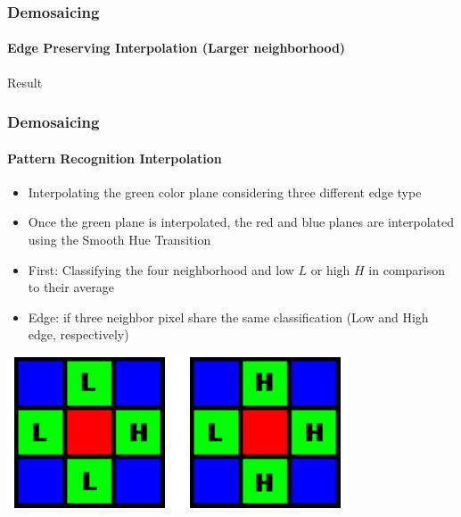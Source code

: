 \documentclass{beamer}
\begin{document}
\begin{frame}
\frametitle{Demosaicing}
\framesubtitle{Edge Preserving Interpolation \small{(Larger neighborhood)}}
\begin{block}{Result}

\end{block}
\end{frame}
\begin{frame}
\frametitle{Demosaicing}
\framesubtitle{Pattern Recognition Interpolation}
\footnotesize{
\begin{itemize}
\item Interpolating the {\color{green}green} color plane considering three different edge type
\item Once the {\color{green}green} plane is interpolated, the {\color{red}red} and {\color{blue}blue} planes are interpolated using the Smooth Hue Transition
\item First: Classifying the four neighborhood and low $L$ or high $H$ in comparison to their average
\item Edge: if three neighbor pixel share the same classification (Low and High edge, respectively)\\
\end{itemize}
}
\begin{center}
\includegraphics[scale=0.33]{images/L7_PRI_Edge.png}
\end{center}
\end{frame}
\end{document}
